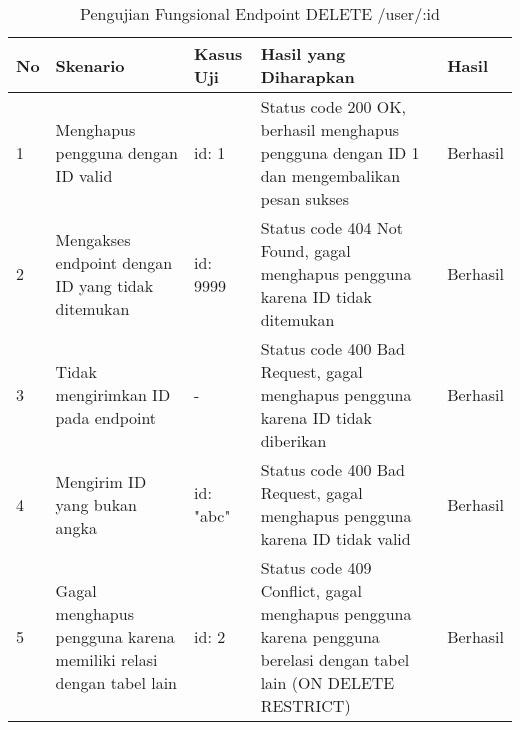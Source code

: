 \begin{table}[H]
    \centering
    \begin{tabular}{|p{0.5cm}|p{3cm}|p{5cm}|p{5cm}|p{1.5cm}|}
        \hline
        \rowcolor[HTML]{DAE8FC} 
        \textbf{No} & \textbf{Skenario} & \textbf{Kasus Uji} & \textbf{Hasil yang Diharapkan} & \textbf{Hasil} \\ \hline
        1 & Menghapus pengguna dengan ID valid & 
        id: 1 & 
        Status code 200 OK, berhasil menghapus pengguna dengan ID 1 dan mengembalikan pesan sukses & 
        Berhasil \\ \hline
        2 & Mengakses endpoint dengan ID yang tidak ditemukan & 
        id: 9999 & 
        Status code 404 Not Found, gagal menghapus pengguna karena ID tidak ditemukan & 
        Berhasil \\ \hline
        3 & Tidak mengirimkan ID pada endpoint & 
        - & 
        Status code 400 Bad Request, gagal menghapus pengguna karena ID tidak diberikan & 
        Berhasil \\ \hline
        4 & Mengirim ID yang bukan angka & 
        id: "abc" & 
        Status code 400 Bad Request, gagal menghapus pengguna karena ID tidak valid & 
        Berhasil \\ \hline
        5 & Gagal menghapus pengguna karena memiliki relasi dengan tabel lain & 
        id: 2 & 
        Status code 409 Conflict, gagal menghapus pengguna karena pengguna berelasi dengan tabel lain (ON DELETE RESTRICT) & 
        Berhasil \\ \hline
    \end{tabular}
    \caption{Pengujian Fungsional Endpoint DELETE /user/:id}
    \label{tab:user_delete_testing}
\end{table}
